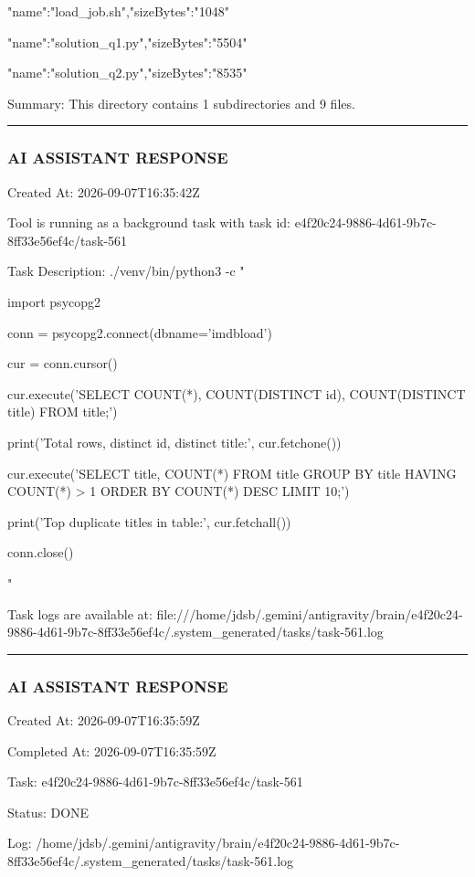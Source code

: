 \documentclass[11pt,a4paper]{article}
\begin{document}
{"name":"load\_job.sh","sizeBytes":"1048"}

{"name":"solution\_q1.py","sizeBytes":"5504"}

{"name":"solution\_q2.py","sizeBytes":"8535"}


Summary: This directory contains 1 subdirectories and 9 files.


\hrule

\subsubsection{AI ASSISTANT RESPONSE}

Created At: 2026-09-07T16:35:42Z

Tool is running as a background task with task id: e4f20c24-9886-4d61-9b7c-8ff33e56ef4c/task-561

Task Description: ./venv/bin/python3 -c "

import psycopg2


conn = psycopg2.connect(dbname='imdbload')

cur = conn.cursor()


cur.execute('SELECT COUNT(*), COUNT(DISTINCT id), COUNT(DISTINCT title) FROM title;')

print('Total rows, distinct id, distinct title:', cur.fetchone())


cur.execute('SELECT title, COUNT(*) FROM title GROUP BY title HAVING COUNT(*) > 1 ORDER BY COUNT(*) DESC LIMIT 10;')

print('Top duplicate titles in table:', cur.fetchall())


conn.close()

"

Task logs are available at: file:///home/jdsb/.gemini/antigravity/brain/e4f20c24-9886-4d61-9b7c-8ff33e56ef4c/.system\_generated/tasks/task-561.log


\hrule

\subsubsection{AI ASSISTANT RESPONSE}

Created At: 2026-09-07T16:35:59Z

Completed At: 2026-09-07T16:35:59Z

Task: e4f20c24-9886-4d61-9b7c-8ff33e56ef4c/task-561

Status: DONE

Log: /home/jdsb/.gemini/antigravity/brain/e4f20c24-9886-4d61-9b7c-8ff33e56ef4c/.system\_generated/tasks/task-561.log
\end{document}

